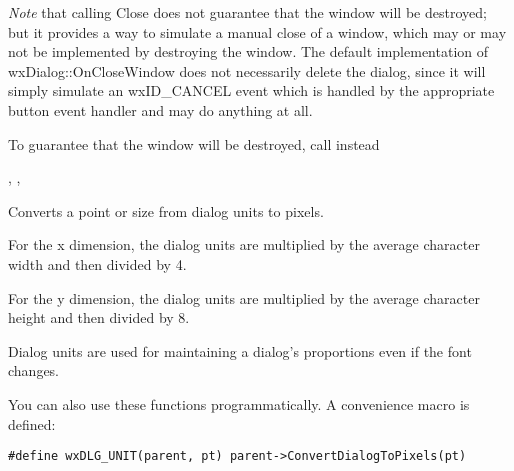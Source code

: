 {\it Note} that calling Close does not guarantee that the window will be
destroyed; but it provides a way to simulate a manual close of a window, which
may or may not be implemented by destroying the window. The default
implementation of wxDialog::OnCloseWindow does not necessarily delete the
dialog, since it will simply simulate an wxID\_CANCEL event which is handled by
the appropriate button event handler and may do anything at all.

To guarantee that the window will be destroyed, call
 instead


,\rtfsp
{},\rtfsp
{}


\label{wxwindowconvertdialogtopixels}



Converts a point or size from dialog units to pixels.

For the x dimension, the dialog units are multiplied by the average character width
and then divided by 4.

For the y dimension, the dialog units are multiplied by the average character height
and then divided by 8.


Dialog units are used for maintaining a dialog's proportions even if the font changes.

You can also use these functions programmatically. A convenience macro is defined:

{\small
\begin{verbatim}
#define wxDLG_UNIT(parent, pt) parent->ConvertDialogToPixels(pt)
\end{verbatim}
}






